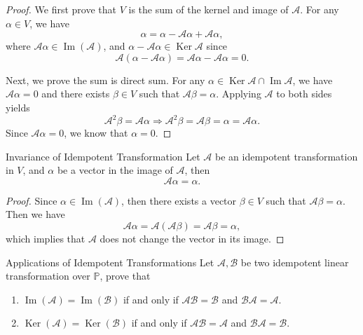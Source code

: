 \begin{proof}
  We first prove that $V$ is the sum of the kernel and image of $\mathcal{A}$.
  For any $\alpha \in V$, we have
  \begin{equation}
  \alpha = \alpha - \mathcal{A} \alpha + \mathcal{A} \alpha,
  \end{equation}
  where $\mathcal{A} \alpha \in \operatorname{Im}(\mathcal{A})$,
  and $\alpha - \mathcal{A}\alpha \in \operatorname{Ker}\mathcal{A}$ since
  \begin{equation}
    \mathcal{A}(\alpha - \mathcal{A} \alpha) = \mathcal{A} \alpha - \mathcal{A} \alpha = 0.
  \end{equation}

  Next, we prove the sum is direct sum.
  For any $\alpha \in \operatorname{Ker} \mathcal{A} \cap \operatorname{Im}
  \mathcal{A}$,
  we have $\mathcal{A} \alpha = 0$ and there exists $\beta \in V$ such that
  $\mathcal{A} \beta = \alpha$.
  Applying $\mathcal{A}$ to both sides yields
  \begin{equation}
    \mathcal{A}^2 \beta = \mathcal{A} \alpha \Rightarrow
    \mathcal{A}^2 \beta = \mathcal{A} \beta = \alpha = \mathcal{A} \alpha.
  \end{equation}
  Since $\mathcal{A} \alpha = 0$, we know that $\alpha = 0$.
\end{proof}

\begin{proposition}{Invariance of Idempotent Transformation}{}
  Let $\mathcal{A}$ be an idempotent transformation in $V$,
  and $\alpha$ be a vector in the image of $\mathcal{A}$,
  then
  \begin{equation}
    \mathcal{A} \alpha = \alpha.
  \end{equation}
\end{proposition}

\begin{proof}
  Since $\alpha \in \operatorname{Im}(\mathcal{A})$,
  then there exists a vector $\beta \in V$ such that $\mathcal{A} \beta = \alpha$.
  Then we have
  \begin{equation}
    \mathcal{A} \alpha = \mathcal{A} (\mathcal{A} \beta) = \mathcal{A} \beta = \alpha,
  \end{equation}
  which implies that $\mathcal{A}$ does not change the vector in its image.
\end{proof}

\begin{example}{Applications of Idempotent Transformations}{}
  Let $\mathcal{A}, \mathcal{B}$ be two idempotent linear transformation over
  $\mathbb{P}$,
  prove that
  \begin{enumerate}
  \item $\operatorname{Im}(\mathcal{A}) = \operatorname{Im}(\mathcal{B})$
    if and only if $\mathcal{A} \mathcal{B} = \mathcal{B}$ and
    $\mathcal{B}\mathcal{A} = \mathcal{A}$.
  \item $\operatorname{Ker}(\mathcal{A}) = \operatorname{Ker}(\mathcal{B})$
    if and only if $\mathcal{A} \mathcal{B} = \mathcal{A}$ and
    $\mathcal{B}\mathcal{A} = \mathcal{B}$.
  \end{enumerate}
\end{example}

